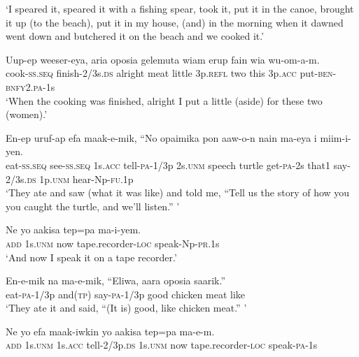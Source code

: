\glt ‘I speared it, speared it with a fishing spear, took it, put it in the canoe, brought it up (to the beach), put it in my house, (and) in the morning when it dawned went down and butchered it on the beach and we cooked it.’ \\
\z


\ea
\gll  Uup-ep  weeser-eya,  aria  oposia  gelemuta  wiam  erup     fain  wia  wu-om-a-m. \\
 cook-\textsc{ss.seq}  finish-2/3s.\textsc{ds}  alright  meat  little  3p.\textsc{refl}  two  this  3p.\textsc{acc}  put-\textsc{ben}-\textsc{bnfy}2.\textsc{pa}-1s \\


\glt ‘When the cooking was finished, alright I put a little (aside) for these two (women).’ \\
\z


\ea
\gll  En-ep  uruf-ap  efa  maak-e-mik,  “No  opaimika     pon  aaw-o-n  nain  ma-eya  i  miim-i-yen. \\
eat-\textsc{ss.seq}  see-\textsc{ss.seq}  1s.\textsc{acc}  tell-\textsc{pa}-1/3p  2s.\textsc{unm}  speech  turtle  get-\textsc{pa}-2s  that1  say-2/3s.\textsc{ds}  1p.\textsc{unm}  hear-Np-\textsc{fu}.1p \\


\glt ‘They ate and saw (what it was like) and told me, “Tell us the story of how you you caught the turtle, and we’ll listen.” ’ \\
\z


\ea
\gll  Ne  yo  aakisa  tep=pa  ma-i-yem. \\
\textsc{add}  1s.\textsc{unm}  now  tape.recorder-\textsc{loc}  speak-Np-\textsc{pr}.1s \\
\glt ‘And now I speak it on a tape recorder.’ \\
\z


\ea
\gll  En-e-mik  na  ma-e-mik,  “Eliwa,  aara  oposia  saarik.” \\
eat-\textsc{pa}-1/3p  and(\textsc{tp})  say-\textsc{pa}-1/3p  good  chicken  meat  like \\
\glt ‘They ate it and said, “(It is) good, like chicken meat.” ’ \\
\z


\ea
\gll  Ne  yo  efa  maak-iwkin  yo  aakisa       tep=pa  ma-e-m. \\
 \textsc{add}  1s.\textsc{unm}  1s.\textsc{acc}  tell-2/3p.\textsc{ds}  1s.\textsc{unm}  now  tape.recorder-\textsc{loc}  speak-\textsc{pa}-1s \\


